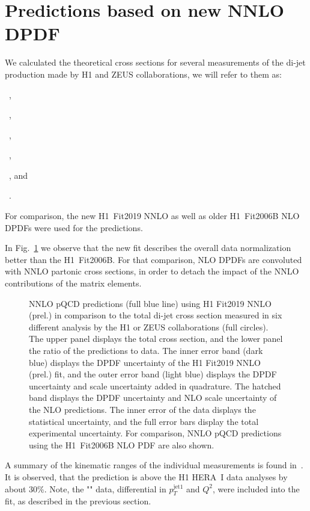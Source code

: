 \documentclass[12pt]{article}
\newcommand{\includegraphicss}[2][]{\fbox{\texttt{[image: \#2]}}}
\begin{document}
\section{Predictions based on new NNLO DPDF}


We calculated the theoretical cross sections for several measurements of the di-jet production made by H1 and ZEUS collaborations, we will refer to them as:
\begin{compactitem}
\item \HFPS ~\cite{Aaron:2011mp},
\item \HVFPS~\cite{Andreev:2015cwa},
\item \HLRG ~\cite{Andreev:2014yra},
\item \HLRGI~\cite{Aktas:2007bv},
\item\HLRGEp~\cite{Aktas:2007hn}, and
\item\ZLRG~\cite{Chekanov:2007aa}.
\end{compactitem}
%
For comparison, the new H1~Fit2019 NNLO as well as older H1~Fit2006B NLO DPDFs \cite{Aktas:2006hy} were used for the predictions.

In Fig.~\ref{figTotalXsecs} we observe that the new fit describes the overall data normalization better than the H1~Fit2006B. For that comparison, NLO DPDFs are convoluted with NNLO partonic cross sections, in order to detach the impact of the NNLO contributions of the matrix elements.
%
\begin{figure}[tbh]
\centering
\includegraphicss[trim={0cm 1.7cm 0 0.7cm},clip,width=.6\textwidth]{{{plots/H1prelim-19-013.fig3}}}
\caption{ NNLO pQCD predictions (full blue line) using H1 Fit2019 NNLO (prel.) in comparison to the total di-jet cross section measured in six different analysis by the H1 or ZEUS collaborations (full circles). The upper panel displays the total cross section, and the lower panel the ratio of the predictions to data. The inner error band (dark blue) displays the DPDF uncertainty of the H1 Fit2019 NNLO (prel.) fit, and the outer error band (light blue) displays the DPDF uncertainty and scale uncertainty added in quadrature. The hatched band displays the DPDF uncertainty and NLO scale uncertainty of the NLO predictions. The inner error of the data displays the statistical uncertainty, and the full error bars display the total experimental uncertainty. For comparison, NNLO pQCD predictions using the H1~Fit2006B NLO PDF are also shown.}
\label{figTotalXsecs}
\end{figure}
%
A summary of the kinematic ranges of the individual measurements is found in~\cite{Britzger:2018zvv}.
It is observed, that the prediction is above the H1 HERA~I data analyses by about 30\%.
Note, the "\HLRG" data, differential in $p_T^{\mathrm{jet}1}$ and $Q^2$, were included into the fit, as described in the previous section.
\end{document}

